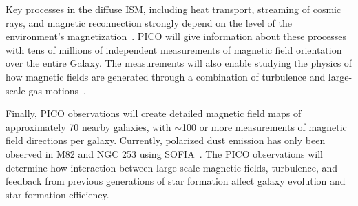 \documentclass[PICOReport.tex]{subfiles}
\begin{document}
Key processes in the diffuse ISM, including heat transport, streaming of cosmic rays, and magnetic reconnection strongly depend on the level of the environment's magnetization~\citep{Lazarian:2006,Lazarian:2016,Lazarian_Vishniac:1999}.
PICO will give information about these processes with tens of millions of independent measurements of magnetic field orientation over the entire Galaxy. The measurements will also enable studying the physics of how magnetic fields are generated through a combination of turbulence and large-scale gas motions~\citep{Xu_2018}.

Finally, PICO observations will create detailed magnetic field maps of approximately 70 nearby galaxies, with $\sim$100 or more measurements of magnetic field directions per galaxy. Currently, polarized dust emission has only been observed in M82 and NGC 253 using SOFIA~\citep{Jonesetal}. The PICO observations will determine how interaction between large-scale magnetic fields, turbulence, and feedback from previous generations of star formation affect galaxy evolution and star formation efficiency.
\end{document}
